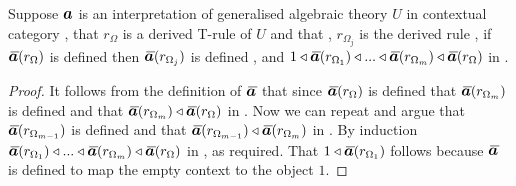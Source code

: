 \begin{lemma}
Suppose $\iI$ is an interpretation of generalised algebraic theory $U$ in contextual category \catc,
that  $r_\Omega$ is a derived T-rule \ZOmega of  $U$
and that \foreachj, $r_{\Omega_j}$ is the derived rule
,
if  $\Ibar(r_\Omega)$ is defined then
$\Ibar(r_{\Omega_j})$ is defined \foreachj, and 
$1 \base \Ibar(r_{\Omega_1}) \base  ... \base \Ibar(r_{\Omega_m}) \base \Ibar(r_\Omega)$ in \catc.
\end{lemma}
\begin{proof}
It follows from the definition of $\Ibar$ that since $\Ibar(r_\Omega)$ is defined that $\Ibar(r_{\Omega_m})$ is defined and that
$\Ibar(r_{\Omega_m}) \base \Ibar(r_\Omega)$ in \catc. Now we can repeat and argue that $\Ibar(r_{\Omega_{m-1}})$ is defined and that $\Ibar(r_{\Omega_{m-1}}) \base \Ibar(r_{\Omega_m})$
in \catc. By induction $\Ibar(r_{\Omega_1}) \base  ... \base \Ibar(r_{\Omega_m}) \base \Ibar(r_\Omega)$ in \catc, as required. 
That $1 \base \Ibar(r_{\Omega_1})$ follows because $\Ibar$ is defined to map the empty context to the object $1$.
\end{proof}



